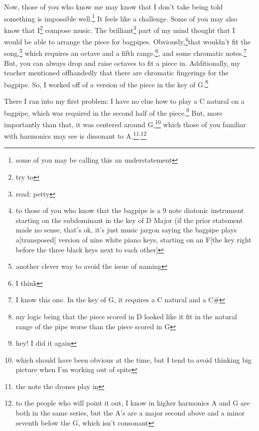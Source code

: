 \documentclass[12pt]{article}[titlepage]
\newcommand{\1}{\={a}}
\newcommand{\2}{\={e}}
\newcommand{\3}{\={\i}}
\newcommand{\4}{\=o}
\newcommand{\5}{\=u}
\newcommand{\6}{\={A}}
\renewcommand{\,}{\textsuperscript{,}}
\begin{document}
Now, those of you who know me may know that I don't take being told something is impossible well.\footnote{some of you may be calling this an understatement}
It feels like a challenge.
Some of you may also know that I\footnote{try to} compose music.
The brilliant\footnote{read: petty} part of my mind thought that I would be able to arrange the piece for bagpipes.
Obviously,\footnote{to those of you who know that the bagpipe is a 9 note diatonic instrument starting on the subdominant in the key of D Major (if the prior statement made no sense, that's ok, it's just music jargon saying the bagpipe plays a[transposed] version of nine white piano keys, starting on an F[the key right before the three black keys next to each other]}that wouldn't fit the song,\footnote{another clever way to avoid the issue of naming} which requires an octave and a fifth range,\footnote{I think}, and some chromatic notes.\footnote{I know this one. In the key of G, it requires a C natural and a C\#}
But, you can always drop and raise octaves to fit a piece in.
Additionally, my teacher mentioned offhandedly that there are chromatic fingerings for the bagpipe.
So, I worked off of a version of the piece in the key of G.\footnote{my logic being that the piece scored in D looked like it fit in the natural range of the pipe worse than the piece scored in G}

There I ran into my first problem: I have no clue how to play a C natural on a bagpipe, which was required in the second half of the piece.\footnote{hey! I did it again}
But, more importantly than that, it was centered around G,\footnote{which should have been obvious at the time, but I tend to avoid thinking big picture when I'm working out of spite} which those of you familiar with harmonics may see is dissonant to A.\footnote{the note the drones play in}\,\footnote{to the people who will point it out, I know in higher harmonics A and G are both in the same series, but the A's are a major second above and a minor seventh below the G, which isn't consonant}
\end{document}
